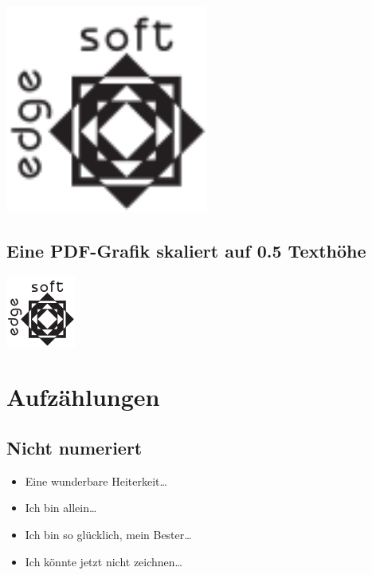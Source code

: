 		\begin{frame}{\insertsectionhead}{\insertsubsectionhead}
			\includegraphics[width=0.5\textwidth]{logo.pdf}
		\end{frame}

		\subsection{Eine PDF-Grafik skaliert auf 0.5 Texthöhe}

		\begin{frame}{\insertsectionhead}{\insertsubsectionhead}
			\includegraphics[height=0.5\textheight]{logo.pdf}
		\end{frame}



	\section{Aufzählungen}

		\subsection{Nicht numeriert}

		\begin{frame}{\insertsectionhead}{\insertsubsectionhead}
			\begin{itemize}
				\item Eine wunderbare Heiterkeit\dots
				\item Ich bin allein\dots
				\item Ich bin so glücklich, mein Bester\dots
				\item Ich könnte jetzt nicht zeichnen\dots
			\end{itemize}
		\end{frame}

